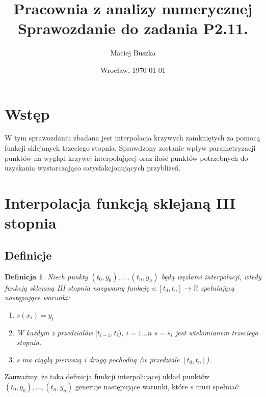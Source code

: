 \documentclass[11pt,wide]{mwart}
\date{Wrocław, \today}
\title{\LARGE\textbf{Pracownia z analizy numerycznej}
  \\Sprawozdanie do zadania \textbf{P2.11.}}
\author{Maciej Buszka}
\newtheorem{defn}{Definicja}
\begin{document}
\maketitle
\thispagestyle{empty}
\tableofcontents

\section{Wstęp}

W tym sprawozdaniu zbadana jest interpolacja krzywych zamkniętych za pomocą funkcji sklejanych trzeciego stopnia. Sprawdzony zostanie wpływ parametryzacji punktów na wygląd krzywej interpolującej oraz ilość punktów potrzebnych do uzyskania wystarczająco satysfakcjonujących przybliżeń.

\section{Interpolacja funkcją sklejaną III stopnia}

\subsection{Definicje}

\begin{defn}

Niech punkty $ (t_0, y_0) , \ldots, (t_n, y_n) $ będą węzłami interpolacji, wtedy funkcją sklejaną III stopnia nazywamy funkcję $ s: [t_0, t_n] \rightarrow \mathbb{R} $ spełniającą następujące warunki:
\begin{enumerate}
\item $ s(x_i) = y_i $
\item W każdym z przedziałów $ [t_{i-1}, t_i ) $, $ i = 1 \ldots n $ $ s = s_i $  jest wielomianem trzeciego stopnia.
\item s ma ciągłą pierwszą i drugą pochodną (w przedziale $ [t_0, t_n] $).
\end{enumerate}

\end{defn}

Zauważmy, że taka definicja funkcji interpolującej układ punktów $ (t_0, y_0) , \ldots, (t_n, y_n) $ generuje następujące warunki, które $ s $ musi spełniać:
\end{document}
